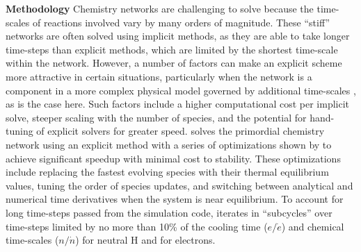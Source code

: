 \noindent
{\bf Methodology}
Chemistry networks are challenging to solve because the time-scales of
reactions involved vary by many orders of magnitude.  These ``stiff''
networks are often solved using implicit methods, as they are able to
take longer time-steps than explicit methods, which are limited by the
shortest time-scale within the network.  However, a number of factors
can make an explicit scheme more attractive in certain situations,
particularly when the network is a component in a more complex physical
model governed by additional time-scales \citep{2012JCoPh.231.5266G},
as is the case here.  Such factors include a higher
computational cost per implicit solve, steeper scaling
with the number of species, and the potential for hand-tuning of
explicit solvers for greater speed.  \grackle{} solves the primordial
chemistry network using an explicit method with a series of
optimizations shown by \citet{1997NewA....2..181A} to achieve
significant speedup with minimal cost to stability.  These
optimizations include replacing the fastest evolving species with
their thermal equilibrium values, tuning the order of species updates,
and switching between analytical and numerical time derivatives when
the system is near equilibrium. To account for long time-steps passed
from the simulation code, \grackle{} iterates in ``subcycles'' over
time-steps limited by no more than 10\% of the cooling time
($e/\dot{e}$) and chemical time-scales ($n/\dot{n}$) for neutral H and
for electrons.

